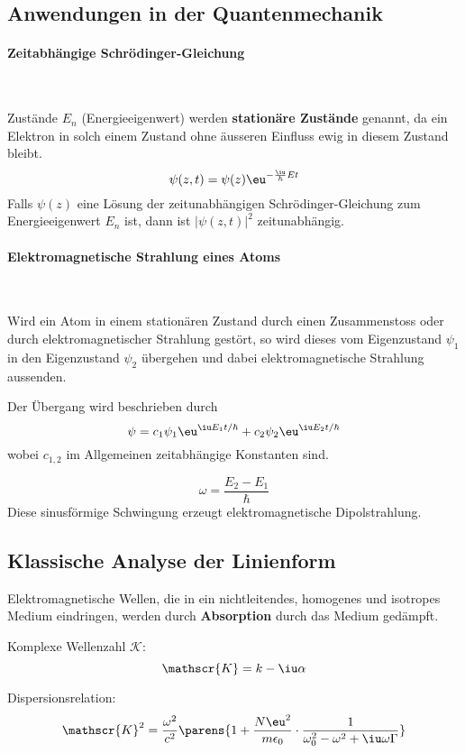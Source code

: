	\subsection{Anwendungen in der Quantenmechanik} %
		\paragraph{Zeitabhängige Schrödinger-Gleichung} %
			~
			
			Zustände $E_n$ (Energieeigenwert) werden \textbf{stationäre Zustände} genannt, da ein Elektron in solch einem Zustand ohne äusseren Einfluss ewig in diesem Zustand bleibt.
			\[
				\psi(z,t) = \psi(z) \eu^{- \frac{\iu}{\hbar} Et}
			\]
			Falls $\psi(z)$ eine Lösung der zeitunabhängigen Schrödinger-Gleichung zum Energieeigenwert $E_n$ ist, dann ist $|\psi(z,t)|^2$ zeitunabhängig.
		\paragraph{Elektromagnetische Strahlung eines Atoms} %
			~
			
			Wird ein Atom in einem stationären Zustand durch einen Zusammenstoss oder durch elektromagnetischer Strahlung gestört, so wird dieses vom Eigenzustand $\psi_1$ in den Eigenzustand $\psi_2$ übergehen und dabei elektromagnetische Strahlung aussenden.
			
			Der Übergang wird beschrieben durch
			\[
				\psi = c_1 \psi_1 \eu^{\iu E_1 t / \hbar} + c_2 \psi_2 \eu^{\iu E_2 t / \hbar}
			\]
			wobei $c_{1,2}$ im Allgemeinen zeitabhängige Konstanten sind.
			
			\[
				\omega = \frac{E_2 - E_1}{\hbar}
			\]
			Diese sinusförmige Schwingung erzeugt elektromagnetische Dipolstrahlung.
	\subsection{Klassische Analyse der Linienform} %
		Elektromagnetische Wellen, die in ein nichtleitendes, homogenes und isotropes Medium eindringen, werden durch \textbf{Absorption} durch das Medium gedämpft.
	
		Komplexe Wellenzahl $\mathscr{K}$:
		\[
			\mathscr{K} = k - \iu \alpha
		\]
		
		Dispersionsrelation:
		\[
			\mathscr{K}^2 = \frac{\omega^2}{c^2} \parens{
				1 + \frac{N \eu^2}{m \epsilon_0} \cdot \frac{1}{\omega_0^2 - \omega^2 + \iu \omega \Gamma}
			}
		\]
		
